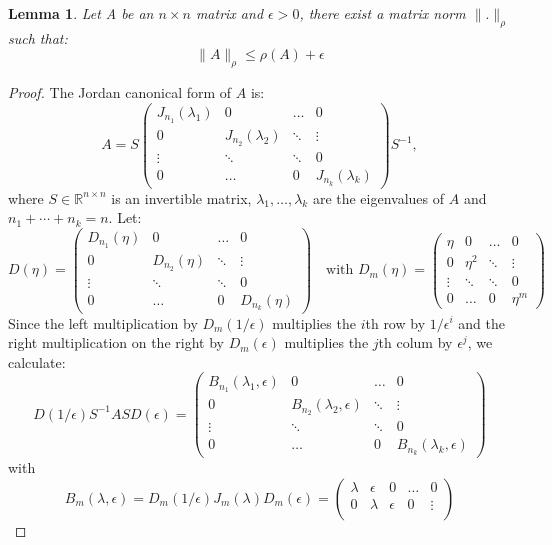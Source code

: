 \documentclass[a4paper,11pt]{report}
\newtheorem{lemma}[theorem]{Lemma}
\newcommand{\R}{{\mathbb R}}
\begin{document}
\begin{lemma}\label{eigennorm}
  Let A be an $n \times n$ matrix and $\epsilon > 0$, there exist a matrix norm $\|. \|_\rho$ 
  such that:
  $$\|A\|_\rho \leq \rho(A) + \epsilon$$
\end{lemma}
\begin{proof}
  The Jordan canonical form of $A$ is:
  $$A = S \begin{pmatrix}
  J_{n_1}(\lambda_1) & 0 & \ldots & 0 \\
  0 & J_{n_2}(\lambda_2) & \ddots & \vdots \\
  \vdots & \ddots & \ddots & 0\\
  0 & \ldots & 0 & J_{n_k}(\lambda_k)
  \end{pmatrix}S^{-1},$$
  where $S \in \R^{n\times n}$ is an invertible matrix, $\lambda_1, \ldots, \lambda_k$ 
  are the eigenvalues of $A$ and $n_1 + \cdots + n_k = n$. Let:
  $$D(\eta) = \begin{pmatrix}
  D_{n_1}(\eta) & 0 & \ldots & 0 \\
  0 & D_{n_2}(\eta) & \ddots & \vdots \\
  \vdots & \ddots & \ddots & 0\\
  0 & \ldots & 0 & D_{n_k}(\eta)
  \end{pmatrix}\quad \text{with } D_m(\eta)= \begin{pmatrix}
  \eta & 0 & \ldots & 0 \\
  0 & \eta^2 & \ddots & \vdots\\
  \vdots & \ddots & \ddots & 0 \\
  0 & \ldots & 0 & \eta^m
  \end{pmatrix}$$
  Since the left multiplication by $D_m(1/\epsilon)$ multiplies the $i$th row by $1/\epsilon^i$ 
  and the right multiplication on the right by $D_m(\epsilon)$ multiplies the $j$th 
  colum by $\epsilon^j$, we calculate:
  $$D(1/\epsilon)S^{-1}ASD(\epsilon)=\begin{pmatrix}
  B_{n_1}(\lambda_1, \epsilon) & 0 & \ldots & 0 \\
  0 & B_{n_2}(\lambda_2, \epsilon) & \ddots & \vdots \\
  \vdots & \ddots & \ddots & 0\\
  0 & \ldots & 0 & B_{n_k}(\lambda_k, \epsilon)  \end{pmatrix}$$
  with 
  $$B_m(\lambda, \epsilon) = D_m(1/\epsilon)J_m(\lambda)D_m(\epsilon)=
  \begin{pmatrix}
   \lambda & \epsilon &  0 & \ldots & 0 \\
  0 & \lambda & \epsilon &  0 & \vdots \\

\end{pmatrix}$$
\end{proof}
\end{document}
